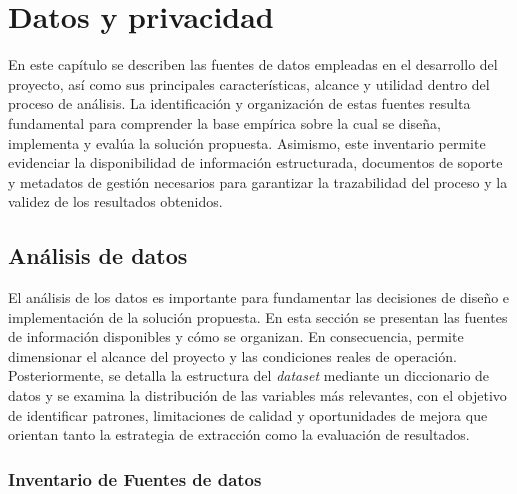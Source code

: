 \chapter{Datos y privacidad}\label{chap:datos}

En este capítulo se describen las fuentes de datos empleadas en el desarrollo del proyecto, así como sus principales características, alcance y utilidad dentro del proceso de análisis. La identificación y organización de estas fuentes resulta fundamental para comprender la base empírica sobre la cual se diseña, implementa y evalúa la solución propuesta. Asimismo, este inventario permite evidenciar la disponibilidad de información estructurada, documentos de soporte y metadatos de gestión necesarios para garantizar la trazabilidad del proceso y la validez de los resultados obtenidos.

\section{Análisis de datos}

El análisis de los datos es importante para fundamentar las decisiones de diseño e implementación de la solución propuesta. En esta sección se presentan las fuentes de información disponibles y cómo se organizan. En consecuencia, permite dimensionar el alcance del proyecto y las condiciones reales de operación. Posteriormente, se detalla la estructura del \textit{dataset} mediante un diccionario de datos y se examina la distribución de las variables más relevantes, con el objetivo de identificar patrones, limitaciones de calidad y oportunidades de mejora que orientan tanto la estrategia de extracción como la evaluación de resultados.

\subsection{Inventario de Fuentes de datos}

